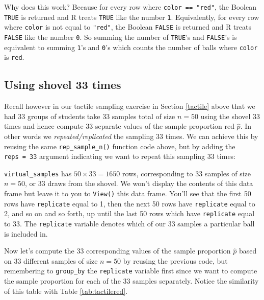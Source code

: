 \documentclass[12pt,]{krantz}
\makeatletter
\newenvironment{Shaded}{\begin{snugshade}}{\end{snugshade}}
\newcommand{\KeywordTok}[1]{\textcolor[rgb]{0.27,0.27,0.27}{\textbf{#1}}}
\newcommand{\DataTypeTok}[1]{\textcolor[rgb]{0.27,0.27,0.27}{#1}}
\newcommand{\DecValTok}[1]{\textcolor[rgb]{0.06,0.06,0.06}{#1}}
\newcommand{\StringTok}[1]{\textcolor[rgb]{0.5,0.5,0.5}{#1}}
\newcommand{\OperatorTok}[1]{\textcolor[rgb]{0.43,0.43,0.43}{\textbf{#1}}}
\newcommand{\NormalTok}[1]{#1}
\newenvironment{kframe}{%
\medskip{}
\setlength{\fboxsep}{.8em}
 \def\at@end@of@kframe{}%
 \ifinner\ifhmode%
  \def\at@end@of@kframe{\end{minipage}}%
  \begin{minipage}{\columnwidth}%
 \fi\fi%
 \def\FrameCommand##1{\hskip\@totalleftmargin \hskip-\fboxsep
 \colorbox{shadecolor}{##1}\hskip-\fboxsep
     \hskip-\linewidth \hskip-\@totalleftmargin \hskip\columnwidth}%
 \MakeFramed {\advance\hsize-\width
   \@totalleftmargin\z@ \linewidth\hsize
   \@setminipage}}%
 {\par\unskip\endMakeFramed%
 \at@end@of@kframe}
\renewenvironment{Shaded}{\begin{kframe}}{\end{kframe}}
\theoremstyle{definition}
\theoremstyle{definition}
\theoremstyle{definition}
\theoremstyle{remark}
\makeatother
\begin{document}
Why does this work? Because for every row where
\texttt{color\ ==\ "red"}, the Boolean \texttt{TRUE} is returned and R
treats \texttt{TRUE} like the number \texttt{1}. Equivalently, for every
row where \texttt{color} is not equal to \texttt{"red"}, the Boolean
\texttt{FALSE} is returned and R treats \texttt{FALSE} like the number
\texttt{0}. So summing the number of \texttt{TRUE}'s and
\texttt{FALSE}'s is equivalent to summing \texttt{1}'s and \texttt{0}'s
which counts the number of balls where \texttt{color} is \texttt{red}.

\subsection{Using shovel 33 times}\label{using-shovel-33-times}

Recall however in our tactile sampling exercise in Section \ref{tactile}
above that we had 33 groups of students take 33 samples total of size
\(n=50\) using the shovel 33 times and hence compute 33 separate values
of the sample proportion red \(\widehat{p}\). In other words we
\emph{repeated/replicated} the sampling 33 times. We can achieve this by
reusing the same \texttt{rep\_sample\_n()} function code above, but by
adding the \texttt{reps\ =\ 33} argument indicating we want to repeat
this sampling 33 times:

\begin{Shaded}
\end{Shaded}

\texttt{virtual\_samples} has \(50 \times 33 = 1650\) rows,
corresponding to 33 samples of size \(n=50\), or 33 draws from the
shovel. We won't display the contents of this data frame but leave it to
you to \texttt{View()} this data frame. You'll see that the first 50
rows have \texttt{replicate} equal to 1, then the next 50 rows have
\texttt{replicate} equal to 2, and so on and so forth, up until the last
50 rows which have \texttt{replicate} equal to 33. The
\texttt{replicate} variable denotes which of our 33 samples a particular
ball is included in.

Now let's compute the 33 corresponding values of the sample proportion
\(\widehat{p}\) based on 33 different samples of size \(n=50\) by
reusing the previous code, but remembering to \texttt{group\_by} the
\texttt{replicate} variable first since we want to compute the sample
proportion for each of the 33 samples separately. Notice the similarity
of this table with Table \ref{tab:tactilered}.
\end{document}

